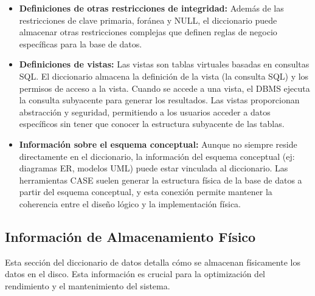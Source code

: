 \begin{itemize}
    \item \textbf{Definiciones de otras restricciones de integridad:} Además de las restricciones de clave primaria, foránea y NULL, el diccionario puede almacenar otras restricciones complejas que definen reglas de negocio específicas para la base de datos.

    \item \textbf{Definiciones de vistas:}  Las vistas son tablas virtuales basadas en consultas SQL. El diccionario almacena la definición de la vista (la consulta SQL) y los permisos de acceso a la vista.  Cuando se accede a una vista, el DBMS ejecuta la consulta subyacente para generar los resultados. Las vistas proporcionan abstracción y seguridad, permitiendo a los usuarios acceder a datos específicos sin tener que conocer la estructura subyacente de las tablas.

    \item \textbf{Información sobre el esquema conceptual:} Aunque no siempre reside directamente en el diccionario, la información del esquema conceptual (ej: diagramas ER, modelos UML) puede estar vinculada al diccionario.  Las herramientas CASE suelen generar la estructura física de la base de datos a partir del esquema conceptual, y esta conexión permite mantener la coherencia entre el diseño lógico y la implementación física.
\end{itemize}

\subsection{Información de Almacenamiento Físico}

Esta sección del diccionario de datos detalla cómo se almacenan físicamente los datos en el disco. Esta información es crucial para la optimización del rendimiento y el mantenimiento del sistema.

